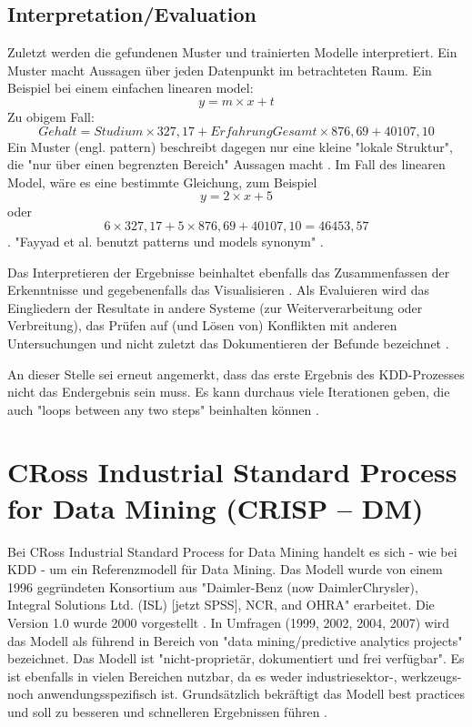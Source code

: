 \subsection{Interpretation/Evaluation}
Zuletzt werden die gefundenen Muster und trainierten Modelle interpretiert. Ein Muster macht Aussagen über jeden Datenpunkt im betrachteten Raum. Ein Beispiel bei einem einfachen linearen \gls{model}: $$y = m \times x + t$$
Zu obigem Fall: $$Gehalt = Studium \times 327,17 + ErfahrungGesamt \times 876,69 + 40107,10$$ Ein Muster (engl. pattern) beschreibt dagegen nur eine kleine "lokale Struktur", die "nur über einen begrenzten Bereich" Aussagen macht \citep[S.~71; eigene Übersetzung]{swamynathan_mastering_2017}. Im Fall des linearen Model, wäre es eine bestimmte Gleichung, zum Beispiel $$y = 2 \times x + 5$$ oder $$ 6 \times 327,17 + 5 \times 876,69 + 40107,10 =  46453,57$$\citep{kraker_towards_2013}. "Fayyad et al. benutzt patterns und models synonym" \citep{kraker_towards_2013}.\par
Das Interpretieren der Ergebnisse beinhaltet ebenfalls das Zusammenfassen der Erkenntnisse und gegebenenfalls das Visualisieren \citep[S.~71]{swamynathan_mastering_2017}. Als Evaluieren wird das Eingliedern der Resultate in andere Systeme (zur Weiterverarbeitung oder Verbreitung), das Prüfen auf (und Lösen von) Konflikten mit anderen Untersuchungen und nicht zuletzt das Dokumentieren der Befunde bezeichnet \citep[S.~42]{fayyad_data_1996}. \par
An dieser Stelle sei erneut angemerkt, dass das erste Ergebnis des KDD-Prozesses nicht das Endergebnis sein muss. Es kann durchaus viele Iterationen geben, die auch "loops between any two steps" beinhalten können \citep[S.~42]{fayyad_data_1996}.

\section{CRoss Industrial Standard Process for Data Mining (CRISP – DM)}\label{sec:crispdm}
Bei CRoss Industrial Standard Process for Data Mining handelt es sich - wie bei KDD - um ein Referenzmodell für Data Mining. Das Modell wurde von einem 1996 gegründeten Konsortium aus "Daimler-Benz (now DaimlerChrysler), Integral Solutions Ltd. (ISL) [jetzt SPSS], NCR, and OHRA"\citep[S.~13]{shearer_crisp-dm_2000} erarbeitet. Die Version 1.0 wurde 2000 vorgestellt \citep[S.~13]{shearer_crisp-dm_2000}. In Umfragen (1999, 2002, 2004, 2007) wird das Modell als führend in Bereich von "data mining/predictive analytics projects"\citep[S.~72]{swamynathan_mastering_2017} bezeichnet. Das Modell ist "nicht-proprietär, dokumentiert und frei verfügbar"\citep[S.~13; eigene Übersetzung]{shearer_crisp-dm_2000}. Es ist ebenfalls in vielen Bereichen nutzbar, da es weder industriesektor-, werkzeugs- noch anwendungsspezifisch ist. Grundsätzlich bekräftigt das Modell best practices und soll zu besseren und schnelleren Ergebnissen führen \citep[S.~13; eigene Übersetzung]{shearer_crisp-dm_2000}. 

